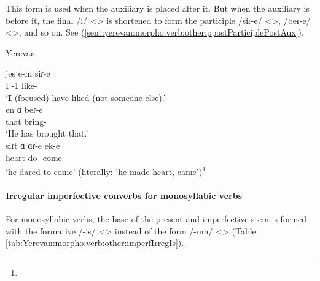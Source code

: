 This form is used when the auxiliary is placed after it. But when the auxiliary is before it, the final /l/ <> is shortened to form the participle /siɾ-e/ <>, /beɾ-e/ <>, and so on. See (\ref{sent:yerevan:morpho:verb:other:ppastParticiplePostAux}). 

\begin{exe}
	\ex Yerevan \label{sent:yerevan:morpho:verb:other:ppastParticiplePostAux}\begin{xlist}
		\ex \gll jes e-m siɾ-e \\
		I {\aux}-1{\sg} like-{\perfcvb} \\ 
		\trans `\textbf{I} (focused) have liked (not someone else).'
		\\  
		\ex \gll en ɑ beɾ-e \\
		that {\aux} bring-{\perfcvb} \\ 
		\trans `He has brought that.'
		\\ 
		\ex \gll siɾt ɑ ɑɾ-e ek-e\\
		heart {\aux} do-{\perfcvb} come-{\perfcvb} \\ 
		\trans `he dared to come' (literally: 'he made heart, came')\footnote{}\\
	\end{xlist}
\end{exe}



\paragraph{Irregular imperfective converbs for monosyllabic verbs}

For monosyllabic verbs, the base of the present and imperfective stem is formed with the formative /-is/ <> instead of the form /-um/ <> (Table \ref{tab:Yerevan:morpho:verb:other:imperfIrregIs}). 




